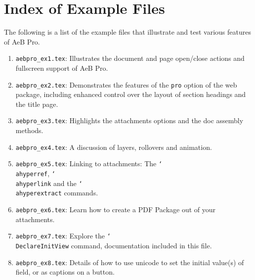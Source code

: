 \documentclass{article}
\newcommand{\cs}[1]{\texttt{\char`\\#1}}
\begin{document}
\section{Index of Example Files}

The following is a list of the example files that illustrate and test various
features of AeB Pro.

\begin{enumerate}
  \item \texttt{aebpro\_ex1.tex}: Illustrates the document and page
        open/close actions and fullscreen support of AeB Pro.

  \item \texttt{aebpro\_ex2.tex}: Demonstrates the features of the
      \texttt{pro} option of the \textsf{web} package, including enhanced control
      over the layout of section headings and the title page.

  \item \texttt{aebpro\_ex3.tex}: Highlights the attachments options and the
  doc assembly methods.

  \item \texttt{aebpro\_ex4.tex}: A discussion of layers, rollovers and animation.

  \item \texttt{aebpro\_ex5.tex}: Linking to attachments: The \cs{ahyperref}, \cs{ahyperlink}
  and the \cs{ahyperextract} commands.

  \item \texttt{aebpro\_ex6.tex}: Learn how to create a PDF Package out of your attachments.

  \item \texttt{aebpro\_ex7.tex}: Explore the \cs{DeclareInitView} command, documentation included
  in this file.

  \item \texttt{aebpro\_ex8.tex}: Details of how to use unicode to set the initial value(s) of field, or as
  captions on a button.
\end{enumerate}
\end{document}
